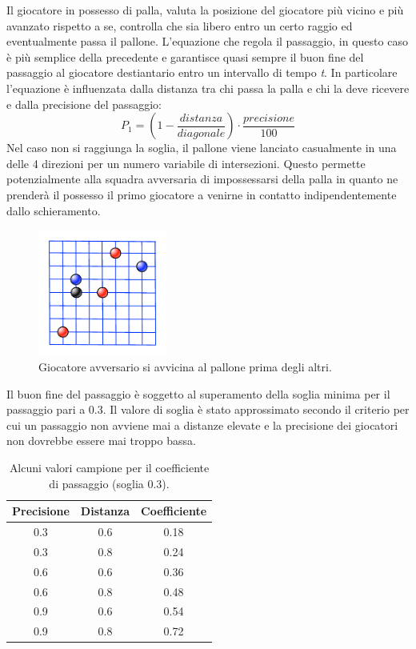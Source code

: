\documentclass[aps,letterpaper,10pt]{article}
\begin{document}
Il giocatore in possesso di palla, valuta la posizione del giocatore pi\`u vicino e pi\`u avanzato rispetto a se, controlla che sia libero entro un certo raggio ed eventualmente passa il pallone. L'equazione che regola il passaggio, in questo caso \`e pi\`u semplice della precedente e garantisce quasi sempre il buon fine del passaggio al giocatore destiantario entro un intervallo di tempo \emph{t}. In particolare l'equazione \`e influenzata dalla distanza tra chi passa la palla e chi la deve ricevere e dalla precisione del passaggio: $$ P_1 = \left( 1 - \frac{distanza}{diagonale} \right) \cdot \frac{precisione}{100} $$ Nel caso non si raggiunga la soglia, il pallone viene lanciato casualmente in una delle 4 direzioni per un numero variabile di intersezioni. Questo permette potenzialmente alla squadra avversaria di impossessarsi della palla in quanto ne prender\`a il possesso il primo giocatore a venirne in contatto indipendentemente dallo schieramento.

\begin{figure}[H]
	\begin{center}
		\includegraphics[width=160px]{images/vision3.pdf}
	\end{center}
\caption{Giocatore avversario si avvicina al pallone prima degli altri.}
\end{figure}

Il buon fine del passaggio \`e soggetto al superamento della soglia minima per il passaggio pari a 0.3. Il valore di soglia \`e stato approssimato secondo il criterio per cui un passaggio non avviene mai a distanze elevate e la precisione dei giocatori non dovrebbe essere mai troppo bassa. 

\begin{table}[H]
\begin{center}
	\begin{tabular}{|c|c||c|}
		\hline
		\textbf{Precisione} & \textbf{Distanza} & \textbf{Coefficiente} \\ \hline \hline
			0.3 & 0.6 & 0.18 \\ \hline
			0.3 & 0.8 & 0.24 \\ \hline
			0.6 & 0.6 & 0.36 \\ \hline
			0.6 & 0.8 & 0.48 \\ \hline
			0.9 & 0.6 & 0.54 \\ \hline
			0.9 & 0.8 & 0.72 \\ \hline
	\end{tabular}
\end{center}
\caption{Alcuni valori campione per il coefficiente di passaggio (soglia 0.3).}
\end{table}
\end{document}
